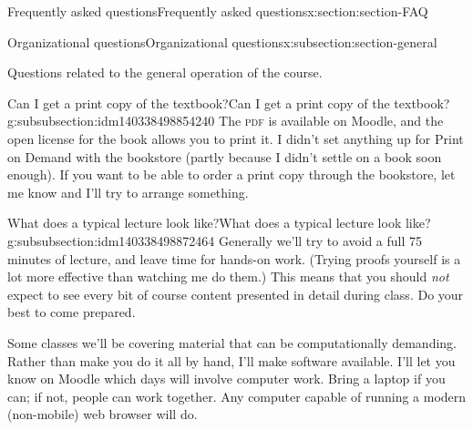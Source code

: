 \documentclass[oneside,10pt,]{article}
\newcommand{\initialism}[1]{\textsc{\MakeLowercase{#1}}}
\begin{document}
\begin{sectionptx}{Frequently asked questions}{}{Frequently asked questions}{}{}{x:section:section-FAQ}
%
%
\typeout{************************************************}
\typeout{************************************************}
%
\begin{subsectionptx}{Organizational questions}{}{Organizational questions}{}{}{x:subsection:section-general}
\begin{introduction}{}%
Questions related to the general operation of the course.%
\end{introduction}%
%
%
\typeout{************************************************}
\typeout{************************************************}
%
\begin{subsubsectionptx}{Can I get a print copy of the textbook?}{}{Can I get a print copy of the textbook?}{}{}{g:subsubsection:idm140338498854240}
The \initialism{PDF} is available on Moodle, and the open license for the book allows you to print it. I didn't set anything up for Print on Demand with the bookstore (partly because I didn't settle on a book soon enough). If you want to be able to order a print copy through the bookstore, let me know and I'll try to arrange something.%
\end{subsubsectionptx}
%
%
\typeout{************************************************}
\typeout{************************************************}
%
\begin{subsubsectionptx}{What does a typical lecture look like?}{}{What does a typical lecture look like?}{}{}{g:subsubsection:idm140338498872464}
Generally we'll try to avoid a full 75 minutes of lecture, and leave time for hands-on work. (Trying proofs yourself is a lot more effective than watching me do them.) This means that you should \emph{not} expect to see every bit of course content presented in detail during class. Do your best to come prepared.%
\par
Some classes we'll be covering material that can be computationally demanding. Rather than make you do it all by hand, I'll make software available. I'll let you know on Moodle which days will involve computer work. Bring a laptop if you can; if not, people can work together. Any computer capable of running a modern (non-mobile) web browser will do.%
\end{subsubsectionptx}
%
%
\typeout{************************************************}

\end{subsectionptx}
\end{sectionptx}
\end{document}
